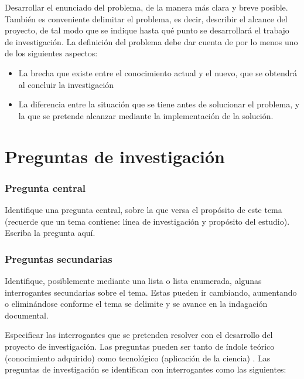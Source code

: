 Desarrollar el enunciado del problema, de la manera más clara y breve posible. También es conveniente delimitar el problema, es decir, describir el alcance del proyecto, de tal modo que se indique hasta qué punto se desarrollará el trabajo de investigación. La definición del problema debe dar cuenta de por lo menos uno de los siguientes aspectos:

\begin{itemize}
	\item La brecha que existe entre el conocimiento actual y el nuevo, que se obtendrá al concluir la investigación
	\item La diferencia entre la situación que se tiene antes de solucionar el problema, y la que se pretende alcanzar mediante la implementación de la solución.
\end{itemize}

\section{Preguntas de investigación}

\subsubsection{Pregunta central}

Identifique una pregunta central, sobre la que versa el propósito de este tema (recuerde que un tema contiene: línea de investigación y propósito del estudio). Escriba la pregunta aquí. 

\subsubsection{Preguntas secundarias}

Identifique, posiblemente mediante una lista o lista enumerada, algunas interrogantes secundarias sobre el tema. Estas pueden ir cambiando, aumentando o eliminándose conforme el tema se delimite y se avance en la indagación documental. 

Especificar las interrogantes que se pretenden resolver con el desarrollo del proyecto de investigación. Las preguntas pueden ser tanto de índole teórico (conocimiento adquirido) como tecnológico (aplicación de la ciencia) \citep{Behar_2008_Metodologia}. Las preguntas de investigación se identifican con interrogantes como las siguientes:

